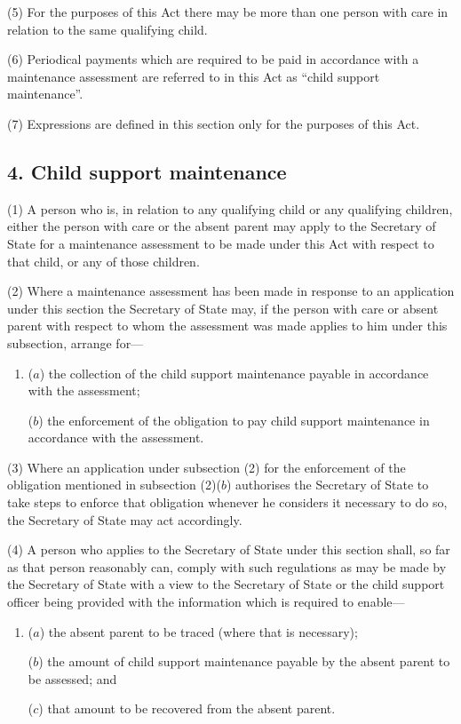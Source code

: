 \documentclass[12pt,a4paper]{article}
\begin{document}
(5) For the purposes of this Act there may be more than one person with care in relation to the same qualifying child.

(6) Periodical payments which are required to be paid in accordance with a maintenance assessment are referred to in this Act as “child support maintenance”.

(7) Expressions are defined in this section only for the purposes of this Act.


\subsection{4. Child support maintenance}

(1) A person who is, in relation to any qualifying child or any qualifying children, either the person with care or the absent parent may apply to the Secretary of State for a maintenance assessment to be made under this Act with respect to that child, or any of those children.

(2) Where a maintenance assessment has been made in response to an application under this section the Secretary of State may, if the person with care or absent parent with respect to whom the assessment was made applies to him under this subsection, arrange for—
\begin{enumerate}\item[]
($a$) the collection of the child support maintenance payable in accordance with the assessment;

($b$) the enforcement of the obligation to pay child support maintenance in accordance with the assessment.
\end{enumerate}

(3) Where an application under subsection (2)  for the enforcement of the obligation mentioned in subsection (2)($b$)  authorises the Secretary of State to take steps to enforce that obligation whenever he considers it necessary to do so, the Secretary of State may act accordingly.

(4) A person who applies to the Secretary of State under this section shall, so far as that person reasonably can, comply with such regulations as may be made by the Secretary of State with a view to the Secretary of State or the child support officer being provided with the information which is required to enable—
\begin{enumerate}\item[]
($a$) the absent parent to be traced (where that is necessary);

($b$) the amount of child support maintenance payable by the absent parent to be assessed; and

($c$) that amount to be recovered from the absent parent.
\end{enumerate}
\end{document}
